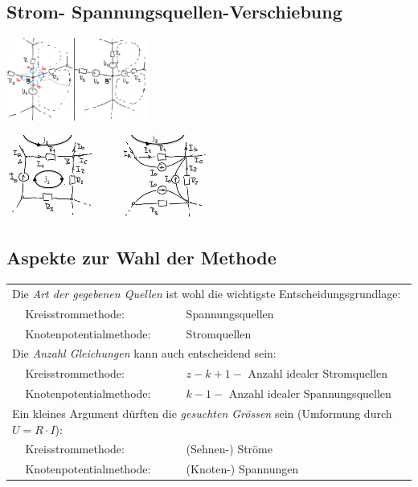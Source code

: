 \subsection{Strom- Spannungsquellen-Verschiebung}
\begin{multicols}{2}
\begin{center}
\includegraphics[width=0.35\textwidth]{pics/dcnet/UQuellenver}\\
\end{center}
\begin{center}
\includegraphics[width=0.5\textwidth]{pics/dcnet/IQuellenver}\\
\end{center}
\end{multicols}

\subsection{Aspekte zur Wahl der Methode}
\begin{tabular}{lll}
	\multicolumn{3}{l}{Die \textit{Art der gegebenen Quellen} ist wohl die wichtigste Entscheidungsgrundlage:}\\
	&Kreisstrommethode: &Spannungsquellen\\
	&Knotenpotentialmethode: &Stromquellen\\
	\multicolumn{3}{l}{Die \textit{Anzahl Gleichungen} kann auch entscheidend sein:}\\
	&Kreisstrommethode: &$z-k+1-$ Anzahl idealer Stromquellen\\
	&Knotenpotentialmethode: &$k-1-$ Anzahl idealer Spannungsquellen\\
	\multicolumn{3}{l}{Ein kleines Argument dürften die \textit{gesuchten Grössen} sein (Umformung durch $U=R \cdot I$):}\\
	&Kreisstrommethode: &(Sehnen-) Ströme\\
	&Knotenpotentialmethode: &(Knoten-) Spannungen
\end{tabular}